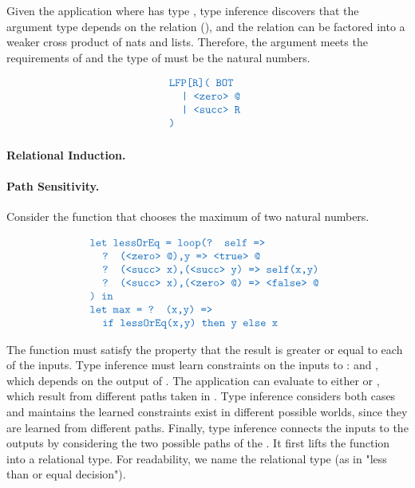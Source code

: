 \documentclass[acmsmall]{acmart}
\theoremstyle{definition}
\begin{document}
Given the application  where  has type , type 
inference discovers that the argument type depends on the relation (), 
and the relation can be factored into a weaker cross product of nats and lists. 
Therefore, the argument meets the requirements
of  and the type of  must be the natural numbers.

\[
  \begin{array}[t]{@{} l}
      \J{LFP[R]( BOT} 
      \\
      \I \J{| <zero> @}
      \\
      \I \J{| <succ> R}
      \\
      \J{)} 
  \end{array}
\]



\paragraph{Relational Induction.} 
\paragraph{Path Sensitivity.} Consider the function  that chooses the maximum of two natural numbers. 



\[
  \begin{array}[t]{@{} l}
      \J{let lessOrEq = loop(? self =>}
      \\
      \I \J{? (<zero> @),y => <true> @}
      \\
      \I \J{? (<succ> x),(<succ> y) => self(x,y)}
      \\
      \I \J{? (<succ> x),(<zero> @) => <false> @}
      \\
      \J{) in}
      \\
      \J{let max = ? (x,y) => }
      \\
      \I \J{if lessOrEq(x,y) then y else x}
  \end{array}
\]


The function  must satisfy the property that the result is greater or equal to each of the inputs. 
Type inference must learn constraints on the inputs to :  and , which 
depends on the output of . The application  can evaluate to either 
or , which result from different paths taken in . 
Type inference considers both cases and maintains the learned constraints
exist in different possible worlds, since they are learned from different paths. Finally, type inference
connects the inputs to the outputs by considering the two possible paths of the .
It first lifts the function  into a relational type. For readability, we name the relational type  (as in "less than or equal decision"). 
\end{document}
